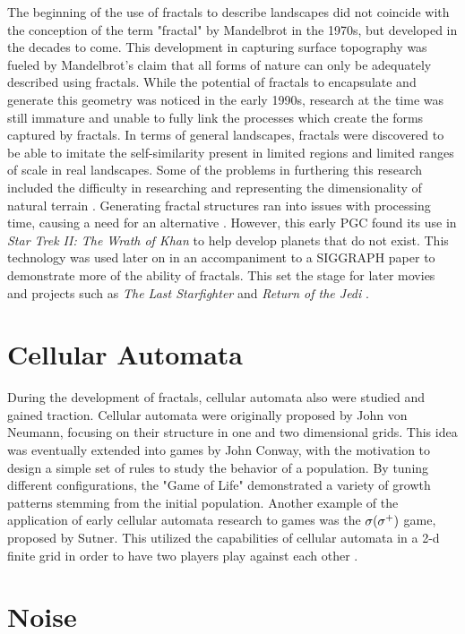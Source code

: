 \documentclass[10pt]{report}
\begin{document}
		The beginning of the use of fractals to describe landscapes did not coincide with the conception of the term "fractal" by Mandelbrot in the 1970s, but developed in the decades to come. This development in capturing surface topography was fueled by Mandelbrot's claim that all forms of nature can only be adequately described using fractals. While the potential of fractals to encapsulate and generate this geometry was noticed in the early 1990s, research at the time was still immature and unable to fully link the processes which create the forms captured by fractals. In terms of general landscapes, fractals were discovered to be able to imitate the self-similarity present in limited regions and limited ranges of scale in real landscapes. Some of the problems in furthering this research included the difficulty in researching and representing the dimensionality of natural terrain \cite{XU1993245}. Generating fractal structures ran into issues with processing time, causing a need for an alternative \cite{inbook}. However, this early PGC found its use in \emph{Star Trek II: The Wrath of Khan} to help develop planets that do not exist. This technology was used later on in an accompaniment to a SIGGRAPH paper to demonstrate more of the ability of fractals. This set the stage for later movies and projects such as \emph{The Last Starfighter} and \emph{Return of the Jedi} \cite{ibm-fractal}. 
		
		\section{Cellular Automata}
		
		During the development of fractals, cellular automata also were studied and gained traction. Cellular automata were originally proposed by John von Neumann, focusing on their structure in one and two dimensional grids. This idea was eventually extended into games by John Conway, with the motivation to design a simple set of rules to study the behavior of a population. By tuning different configurations, the "Game of Life" demonstrated a variety of growth patterns stemming from the initial population. Another example of the application of early cellular automata research to games was the \(\sigma(\sigma\textsuperscript{+})\) game, proposed by Sutner. This utilized the capabilities of cellular automata in a 2-d finite grid in order to have two players play against each other \cite{10.1145/349194.349202}.
		
		\section{Noise}
		
\end{document}
